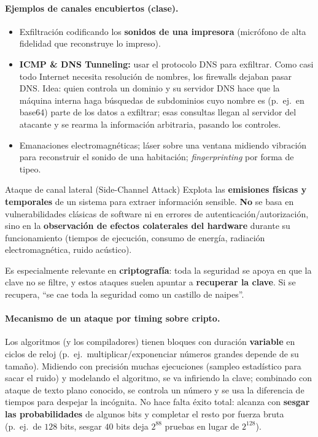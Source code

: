 \documentclass[../main.tex]{subfiles}
\begin{document}
\paragraph{Ejemplos de canales encubiertos (clase).}
\begin{itemize}[noitemsep]
  \item Exfiltración codificando los \textbf{sonidos de una impresora} (micrófono
        de alta fidelidad que reconstruye lo impreso).
  \item \textbf{ICMP \& DNS Tunneling:} usar el protocolo DNS para exfiltrar. Como
        casi todo Internet necesita resolución de nombres, los firewalls dejaban
        pasar DNS. Idea: quien controla un dominio y su servidor DNS hace que la
        máquina interna haga búsquedas de subdominios cuyo nombre es (p.\ ej.\ en
        base64) parte de los datos a exfiltrar; esas consultas llegan al servidor
        del atacante y se rearma la información arbitraria, pasando los controles.
  \item Emanaciones electromagnéticas; láser sobre una ventana midiendo vibración
        para reconstruir el sonido de una habitación; \textit{fingerprinting} por
        forma de tipeo.
\end{itemize}

\begin{definicion}{Ataque de canal lateral (Side-Channel Attack)}
Explota las \textbf{emisiones físicas y temporales} de un sistema para extraer
información sensible. \textbf{No} se basa en vulnerabilidades clásicas de software
ni en errores de autenticación/autorización, sino en la \textbf{observación de
efectos colaterales del hardware} durante su funcionamiento (tiempos de ejecución,
consumo de energía, radiación electromagnética, ruido acústico).
\end{definicion}

Es especialmente relevante en \textbf{criptografía}: toda la seguridad se apoya en
que la clave no se filtre, y estos ataques suelen apuntar a \textbf{recuperar la
clave}. Si se recupera, ``se cae toda la seguridad como un castillo de naipes''.

\paragraph{Mecanismo de un ataque por timing sobre cripto.} Los algoritmos (y los
compiladores) tienen bloques con duración \textbf{variable} en ciclos de reloj
(p.\ ej.\ multiplicar/exponenciar números grandes depende de su tamaño). Midiendo
con precisión muchas ejecuciones (sampleo estadístico para sacar el ruido) y
modelando el algoritmo, se va infiriendo la clave; combinado con ataque de texto
plano conocido, se controla un número y se usa la diferencia de tiempos para
despejar la incógnita. No hace falta éxito total: alcanza con \textbf{sesgar las
probabilidades} de algunos bits y completar el resto por fuerza bruta (p.\ ej.\ de
$128$ bits, sesgar $40$ bits deja $2^{88}$ pruebas en lugar de $2^{128}$).
\end{document}
